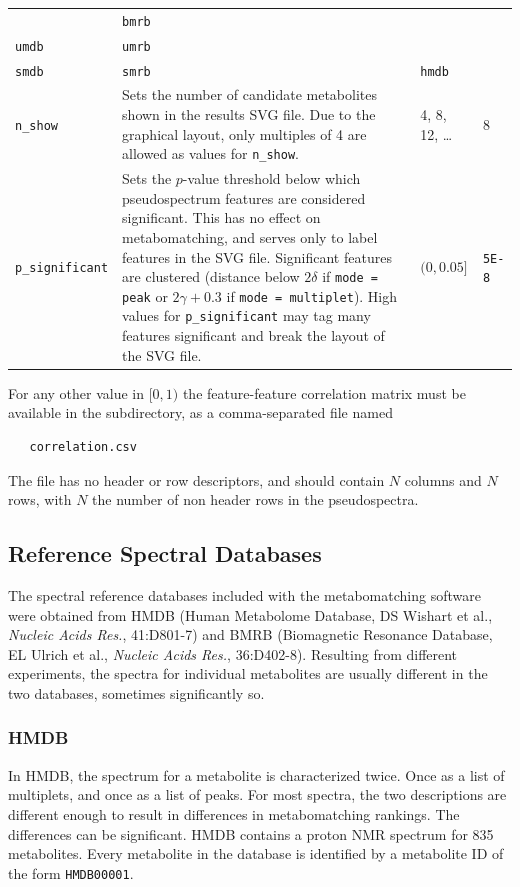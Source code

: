 \documentclass[a4paper,11pt]{article}
\begin{document}
\begin{table}[h]
\begin{tabularx}{1.2\linewidth}{@{}lXll@{}}
\begin{tabular}[t]{@{}ll@{}}\texttt{hmdb}&\texttt{bmrb}\\\texttt{umdb}&\texttt{umrb}\\\texttt{smdb}&\texttt{smrb}\end{tabular} & %
\texttt{hmdb}\\
\texttt{n\_show} & %
Sets the number of candidate metabolites shown in the results SVG file. Due to the graphical layout, only multiples of 4 are allowed as values for \texttt{n\_show}. & %
4, 8, 12, \ldots &
8 \\
\texttt{p\_significant} & %
Sets the $p$-value threshold below which pseudospectrum features are considered significant. This has no effect on metabomatching, and serves only to label features in the SVG file. Significant features are clustered (distance below $2\delta$ if \texttt{mode = peak} or $2\gamma+0.3$ if \texttt{mode = multiplet}). High values for \texttt{p\_significant} may tag many features significant and break the layout of the SVG file. & %
$(0,0.05]$ & %
\texttt{5E-8} \\
\bottomrule
\end{tabularx}
\end{table}
For any other value in $[0,1)$ the feature-feature correlation matrix must be available in the subdirectory, as a comma-separated file named
\begin{verbatim}
   correlation.csv
\end{verbatim}
The file has no header or row descriptors, and should contain $N$ columns and $N$ rows, with $N$ the number of non header rows in the pseudospectra.
\subsection{Reference Spectral Databases\label{sec:databases}}
The spectral reference databases included with the metabomatching software were obtained from HMDB (Human Metabolome Database, DS Wishart et al., \emph{Nucleic Acids Res.}, 41:D801-7) and BMRB (Biomagnetic Resonance Database, EL Ulrich et al., \emph{Nucleic Acids Res.}, 36:D402-8). Resulting from different experiments, the spectra for individual metabolites are usually different in the two databases, sometimes significantly so.
\subsubsection{HMDB}
In HMDB, the spectrum for a metabolite is characterized twice. Once as a list of multiplets, and once as a list of peaks. For most spectra, the two descriptions are different enough to result in differences in metabomatching rankings. The differences can be significant. HMDB contains a proton NMR spectrum for 835 metabolites. Every metabolite in the database is identified by a metabolite ID of the form \verb|HMDB00001|.
\end{document}
